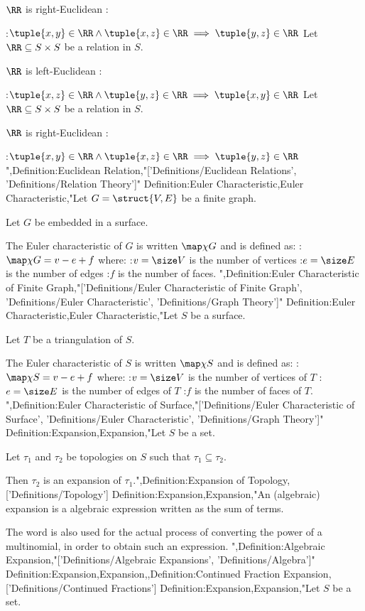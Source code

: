 $\RR$ is right-Euclidean :

:$\tuple {x, y} \in \RR \land \tuple {x, z} \in \RR \implies \tuple {y, z} \in \RR$
Let $\RR \subseteq S \times S$ be a relation in $S$.


$\RR$ is left-Euclidean :

:$\tuple {x, z} \in \RR \land \tuple {y, z} \in \RR \implies \tuple {x, y} \in \RR$
Let $\RR \subseteq S \times S$ be a relation in $S$.


$\RR$ is right-Euclidean :

:$\tuple {x, y} \in \RR \land \tuple {x, z} \in \RR \implies \tuple {y, z} \in \RR$
",Definition:Euclidean Relation,"['Definitions/Euclidean Relations', 'Definitions/Relation Theory']"
Definition:Euler Characteristic,Euler Characteristic,"Let $G = \struct {V, E}$ be a finite graph.

Let $G$ be embedded in a surface.


The Euler characteristic of $G$ is written $\map \chi G$ and is defined as:
:$\map \chi G = v - e + f$
where:
:$v = \size V$ is the number of vertices
:$e = \size E$ is the number of edges
:$f$ is the number of faces.
",Definition:Euler Characteristic of Finite Graph,"['Definitions/Euler Characteristic of Finite Graph', 'Definitions/Euler Characteristic', 'Definitions/Graph Theory']"
Definition:Euler Characteristic,Euler Characteristic,"Let $S$ be a surface.

Let $T$ be a triangulation of $S$.

The Euler characteristic of $S$ is written $\map \chi S$ and is defined as:
:$\map \chi S = v - e + f$
where:
:$v = \size V$ is the number of vertices of $T$
:$e = \size E$ is the number of edges of $T$
:$f$ is the number of faces of $T$.
",Definition:Euler Characteristic of Surface,"['Definitions/Euler Characteristic of Surface', 'Definitions/Euler Characteristic', 'Definitions/Graph Theory']"
Definition:Expansion,Expansion,"Let $S$ be a set.

Let $\tau_1$ and $\tau_2$ be topologies on $S$ such that $\tau_1 \subseteq \tau_2$.


Then $\tau_2$ is an expansion of $\tau_1$.",Definition:Expansion of Topology,['Definitions/Topology']
Definition:Expansion,Expansion,"An (algebraic) expansion is a algebraic expression written as the sum of terms.

The word is also used for the actual process of converting the power of a multinomial, in order to obtain such an expression.
",Definition:Algebraic Expansion,"['Definitions/Algebraic Expansions', 'Definitions/Algebra']"
Definition:Expansion,Expansion,,Definition:Continued Fraction Expansion,['Definitions/Continued Fractions']
Definition:Expansion,Expansion,"Let $S$ be a set.

